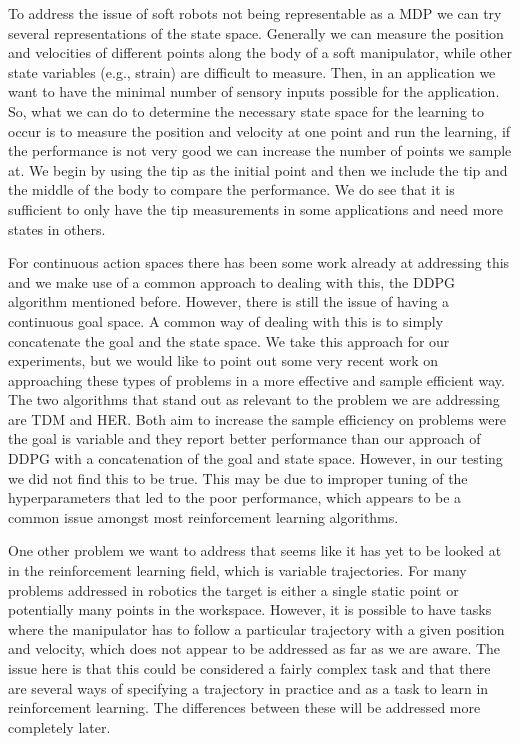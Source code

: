 \documentclass[letterpaper, 10 pt, conference]{ieeeconf}  %
\begin{document}
To address the issue of soft robots not being representable as a MDP we can try several representations of the state space. Generally we can measure the position and velocities of different points along the body of a soft manipulator, while other state variables (e.g., strain) are difficult to measure. Then, in an application we want to have the minimal number of sensory inputs possible for the application. So, what we can do to determine the necessary state space for the learning to occur is to measure the position and velocity at one point and run the learning, if the performance is not very good we can increase the number of points we sample at. We begin by using the tip as the initial point and then we include the tip and the middle of the body to compare the performance. We do see that it is sufficient to only have the tip measurements in some applications and need more states in others.

For continuous action spaces there has been some work already at addressing this and we make use of a common approach to dealing with this, the DDPG algorithm mentioned before. However, there is still the issue of having a continuous goal space. A common way of dealing with this is to simply concatenate the goal and the state space. We take this approach for our experiments, but we would like to point out some very recent work on approaching these types of problems in a more effective and sample efficient way. The two algorithms that stand out as relevant to the problem we are addressing are TDM and HER. Both aim to increase the sample efficiency on problems were the goal is variable and they report better performance than our approach of DDPG with a concatenation of the goal and state space. However, in our testing we did not find this to be true. This may be due to improper tuning of the hyperparameters that led to the poor performance, which appears to be a common issue amongst most reinforcement learning algorithms.

One other problem we want to address that seems like it has yet to be looked at in the reinforcement learning field, which is variable trajectories. For many problems addressed in robotics the target is either a single static point or potentially many points in the workspace. However, it is possible to have tasks where the manipulator has to follow a particular trajectory with a given position and velocity, which does not appear to be addressed as far as we are aware. The issue here is that this could be considered a fairly complex task and that there are several ways of specifying a trajectory in practice and as a task to learn in reinforcement learning. The differences between these will be addressed more completely later.
\end{document}
